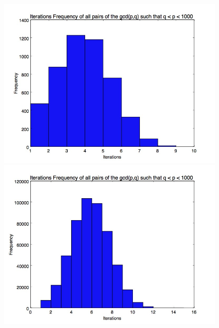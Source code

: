 \documentclass[11pt]{article}
\begin{document}
	\begin{figure}
		\centering
		\includegraphics[scale=.45]{2digit_iterationfreq.jpg}
		\includegraphics[scale=.45]{3digit_iteration_freq.jpg}\\
	\end{figure}
	
\end{document}
